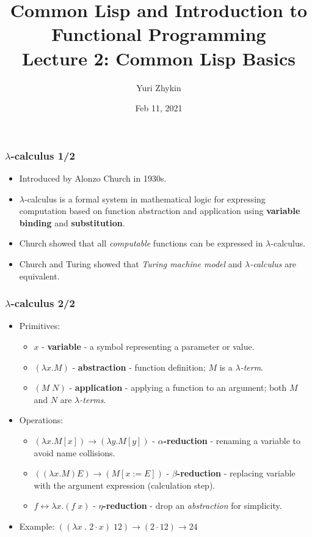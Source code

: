 \documentclass{beamer}
\title{
  Common Lisp and Introduction to Functional Programming \\
  Lecture 2: Common Lisp Basics
}
\author{Yuri Zhykin}
\date{Feb 11, 2021}
\begin{document}
\frame{\titlepage}

\begin{frame}
  \frametitle{$\lambda$-calculus 1/2}
  \begin{itemize}
  \item Introduced by Alonzo Church in 1930s.
  \item $\lambda$-calculus is a formal system in mathematical logic for
    expressing computation based on function abstraction and application using
    \textbf{variable binding} and \textbf{substitution}.
  \item Church showed that all \textit{computable} functions can be expressed in
    $\lambda$-calculus.
  \item Church and Turing showed that \textit{Turing machine model} and
    \textit{$\lambda$-calculus} are equivalent.
  \end{itemize}
\end{frame}

\begin{frame}
  \frametitle{$\lambda$-calculus 2/2}
  \begin{itemize}
  \item Primitives:
    \begin{itemize}
    \item $x$ - \textbf{variable} - a symbol representing a parameter or value.
    \item $(\lambda x . M)$ - \textbf{abstraction} - function definition; $M$ is a
      \textit{$\lambda$-term}.
    \item $(M\;N)$ - \textbf{application} - applying a function to an argument;
      both $M$ and $N$ are \textit{$\lambda$-terms}.
    \end{itemize}
  \item Operations:
    \begin{itemize}
    \item $(\lambda x . M[x]) \rightarrow (\lambda y . M[y])$ -
      \textbf{$\alpha$-reduction} - renaming a variable to avoid name
      collisions.
    \item $((\lambda x . M) E) \rightarrow (M[x := E])$ -
      \textbf{$\beta$-reduction} - replacing variable with the argument
      expression (calculation step).
    \item $f \leftrightarrow \lambda x . (f\;x)$ -
      \textbf{$\eta$-reduction} - drop an \textit{abstraction} for simplicity.
    \end{itemize}
  \item Example: $((\lambda x\;.\;2 \cdot x)\;12) \rightarrow (2 \cdot 12)
    \rightarrow 24$
  \end{itemize}
\end{frame}
\end{document}
